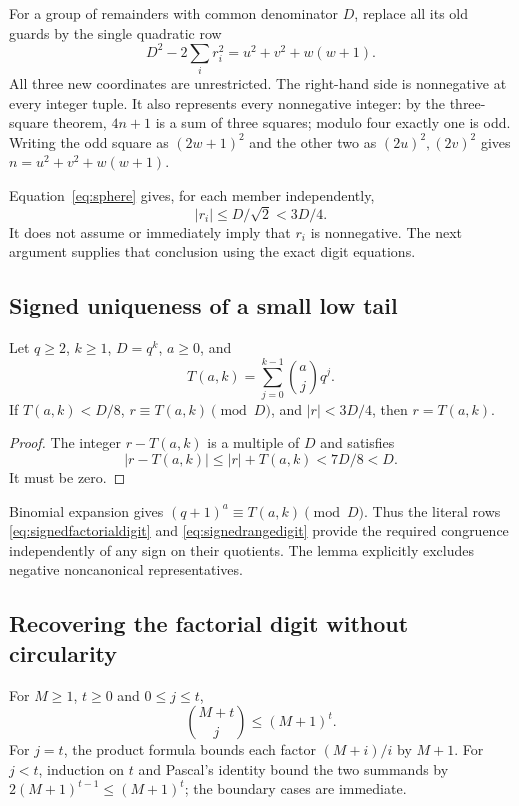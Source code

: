 For a group of remainders with common denominator $D$, replace all its
old guards by the single quadratic row
\begin{equation}\label{eq:sphere}
 \boxed{D^2-2\sum_i r_i^2=u^2+v^2+w(w+1).}
\end{equation}
All three new coordinates are unrestricted. The right-hand side is
nonnegative at every integer tuple. It also represents every nonnegative
integer: by the three-square theorem, $4n+1$ is a sum of three squares;
modulo four exactly one is odd. Writing the odd square as $(2w+1)^2$
and the other two as $(2u)^2,(2v)^2$ gives
$n=u^2+v^2+w(w+1)$.

Equation~\eqref{eq:sphere} gives, for each member independently,
\begin{equation}\label{eq:sphereradius}
 |r_i|\le D/\sqrt2<3D/4.
\end{equation}
It does not assume or immediately imply that $r_i$ is nonnegative. The
next argument supplies that conclusion using the exact digit equations.

\subsection{Signed uniqueness of a small low tail}
\begin{lemma}\label{lem:signedtail}
Let $q\ge2$, $k\ge1$, $D=q^k$, $a\ge0$, and
\[
 T(a,k)=\sum_{j=0}^{k-1}\binom ajq^j.
\]
If $T(a,k)<D/8$, $r\equiv T(a,k)\pmod D$, and $|r|<3D/4$, then
$r=T(a,k)$.
\end{lemma}
\begin{proof}
The integer $r-T(a,k)$ is a multiple of $D$ and satisfies
\[
 |r-T(a,k)|\le |r|+T(a,k)<7D/8<D.
\]
It must be zero.
\end{proof}
Binomial expansion gives $(q+1)^a\equiv T(a,k)\pmod D$.
Thus the literal rows \eqref{eq:signedfactorialdigit} and
\eqref{eq:signedrangedigit} provide the required congruence independently
of any sign on their quotients. The lemma explicitly excludes negative
noncanonical representatives.

\subsection{Recovering the factorial digit without circularity}
For $M\ge1$, $t\ge0$ and $0\le j\le t$,
\begin{equation}\label{eq:pascalbound}
 \binom{M+t}{j}\le(M+1)^t.
\end{equation}
For $j=t$, the product formula bounds each factor $(M+i)/i$ by $M+1$.
For $j<t$, induction on $t$ and Pascal's identity bound the two summands
by $2(M+1)^{t-1}\le(M+1)^t$; the boundary cases are immediate.

